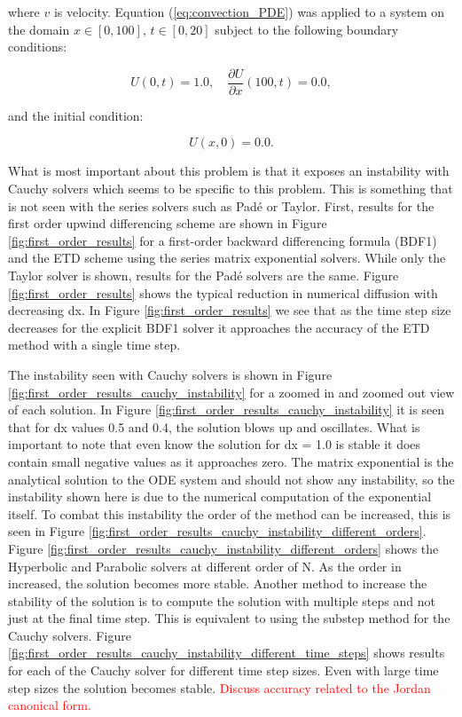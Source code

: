 \noindent where $v$ is velocity. Equation (\ref{eq:convection_PDE}) was applied to a system on the domain $x \in [0, 100]$, $t \in [0, 20]$ subject to the following boundary conditions:

\begin{equation}
    U(0,t) = 1.0, \quad\frac{\partial U}{\partial x}(100, t) = 0.0,
\end{equation}

\noindent and the initial condition:

\begin{equation}
    U(x,0) = 0.0.
\end{equation}

What is most important about this problem is that it exposes an instability with Cauchy solvers which seems to be specific to this problem. This is something that is not seen with the series solvers such as Pad\'e or Taylor. First, results for the first order upwind differencing scheme are shown in Figure \ref{fig:first_order_results}  for a first-order backward differencing formula (BDF1) and the ETD scheme using the series matrix exponential solvers. While only the Taylor solver is shown, results for the Pad\'e solvers are the same. Figure \ref{fig:first_order_results} shows the typical reduction in numerical diffusion with decreasing dx. In Figure \ref{fig:first_order_results} we see that as the time step size decreases for the explicit BDF1 solver it approaches the accuracy of the ETD method with a single time step. 

The instability seen with Cauchy solvers is shown in Figure \ref{fig:first_order_results_cauchy_instability} for a zoomed in and zoomed out view of each solution. In Figure \ref{fig:first_order_results_cauchy_instability} it is seen that for dx values 0.5 and 0.4, the solution blows up and oscillates. What is important to note that even know the solution for dx = 1.0 is stable it does contain small negative values as it approaches zero. The matrix exponential is the analytical solution to the ODE system and should not show any instability, so the instability shown here is due to the numerical computation of the exponential itself. To combat this instability the order of the method can be increased, this is seen in Figure \ref{fig:first_order_results_cauchy_instability_different_orders}. Figure \ref{fig:first_order_results_cauchy_instability_different_orders} shows the Hyperbolic and Parabolic solvers at different order of N. As the order in increased, the solution becomes more stable.  Another method to increase the stability of the solution is to compute the solution with multiple steps and not just at the final time step. This is equivalent to using the substep method for the Cauchy solvers. Figure \ref{fig:first_order_results_cauchy_instability_different_time_steps} shows results for each of the Cauchy solver for different time step sizes. Even with large time step sizes the solution becomes stable.   \textcolor{red}{Discuss accuracy related to the Jordan canonical form.}

